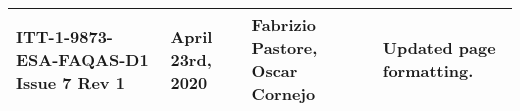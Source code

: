 \begin{longtable}{|p{2cm}|p{1cm}|p{1.5cm}|p{9cm}|@{}}
\\

\hline
ITT-1-9873-ESA-FAQAS-D1
Issue 7 Rev 1
&April 23rd, 2020
&Fabrizio Pastore, Oscar Cornejo
&
Updated page formatting.

\\


\hline                                                           
\end{longtable}
\normalsize

\clearpage